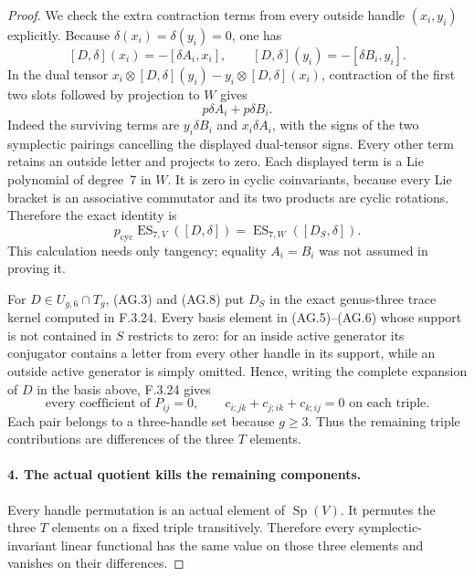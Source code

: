 \begin{proof}
We check the extra contraction terms from every
outside handle $(x_i,y_i)$ explicitly. Because
$\delta(x_i)=\delta(y_i)=0$, one has
\[
 [D,\delta](x_i)=-[\delta A_i,x_i],\qquad
 [D,\delta](y_i)=-[\delta B_i,y_i].
\]
In the dual tensor
$x_i\otimes[D,\delta](y_i)
 -y_i\otimes[D,\delta](x_i)$, contraction of
the first two slots followed by projection to
$W$ gives
\[
                           p\delta A_i+p\delta B_i.
\]
Indeed the surviving terms are $y_i\delta B_i$
and $x_i\delta A_i$, with the signs of the two
symplectic pairings cancelling the displayed
dual-tensor signs. Every other term retains an
outside letter and projects to zero. Each
displayed term is a Lie polynomial of degree~7
in $W$. It is zero in cyclic coinvariants,
because every Lie bracket is an associative
commutator and its two products are cyclic
rotations. Therefore the exact identity is
\[
 p_{\mathrm{cyc}}\operatorname{ES}_{7,V}([D,\delta])
       =\operatorname{ES}_{7,W}([D_S,\delta]).              \tag{AG.8}
\]
This calculation needs only tangency; equality
$A_i=B_i$ was not assumed in proving it.

For $D\in U_{g,6}\cap T_g$, (AG.3) and (AG.8)
put $D_S$ in the exact genus-three trace kernel
computed in F.3.24. Every basis element in
(AG.5)--(AG.6) whose support is not contained
in $S$ restricts to zero: for an inside active
generator its conjugator contains a letter
from every other handle in its support, while
an outside active generator is simply omitted.
Hence, writing the complete expansion of $D$
in the basis above, F.3.24 gives
\[
    \text{every coefficient of }P_{ij}=0,
    \qquad
    c_{i;jk}+c_{j;ik}+c_{k;ij}=0
    \text{ on each triple}.                               \tag{AG.9}
\]
Each pair belongs to a three-handle set because
$g\geq3$. Thus the remaining triple contributions
are differences of the three $T$ elements.

\paragraph{4. The actual quotient kills the remaining components.}
Every handle permutation is an actual element of
$\operatorname{Sp}(V)$. It permutes the three
$T$ elements on a fixed triple transitively.
Therefore every symplectic-invariant linear
functional has the same value on those three
elements and vanishes on their differences.


\end{proof}
